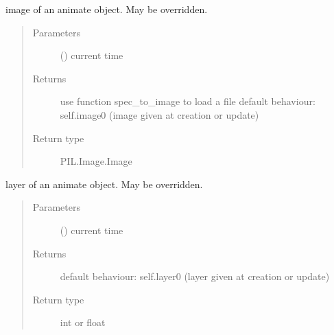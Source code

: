 \documentclass[letterpaper,10pt,english]{sphinxmanual}
\begin{document}
\begin{fulllineitems}

\begin{fulllineitems}
\label{\detokenize{Reference:salabim.Animate.image}}
image of an animate object. May be overridden.
\begin{quote}\begin{description}
\item[{Parameters}] \leavevmode
{} () \textendash{} current time

\item[{Returns}] \leavevmode
{} \textendash{} use function spec\_to\_image to load a file
default behaviour: self.image0 (image given at creation or update)

\item[{Return type}] \leavevmode
PIL.Image.Image

\end{description}\end{quote}

\end{fulllineitems}


\begin{fulllineitems}
\label{\detokenize{Reference:salabim.Animate.layer}}
layer of an animate object. May be overridden.
\begin{quote}\begin{description}
\item[{Parameters}] \leavevmode
{} () \textendash{} current time

\item[{Returns}] \leavevmode
{} \textendash{} default behaviour: self.layer0 (layer given at creation or update)

\item[{Return type}] \leavevmode
int or float

\end{description}\end{quote}

\end{fulllineitems}


\end{fulllineitems}
\end{document}
